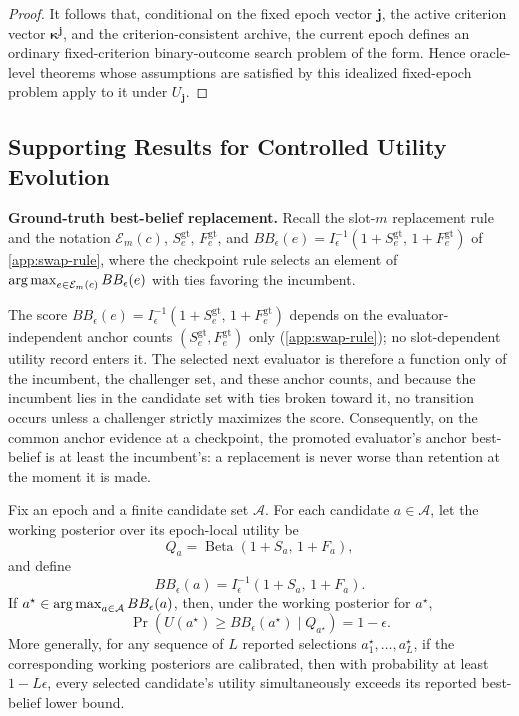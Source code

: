 \begin{proof}
It follows that, conditional on the fixed epoch vector \(\boldsymbol{j}\), the active criterion vector
\(\boldsymbol{\kappa}^{\boldsymbol{j}}\), and the criterion-consistent archive, the current epoch defines an
ordinary fixed-criterion binary-outcome search problem of the \hgm form. Hence \hgm oracle-level
theorems whose assumptions are satisfied by this idealized fixed-epoch problem apply to it
under \(U_{\boldsymbol{j}}\).
\end{proof}



\subsection{Supporting Results for Controlled Utility Evolution}
\label{app:controlled_utility_proofs}


\noindent\textbf{Ground-truth best-belief replacement.}
Recall the slot-\(m\) replacement rule and the notation \(\mathcal E_m(c)\), \(S^{\mathrm{gt}}_e\), \(F^{\mathrm{gt}}_e\), and \(BB_\epsilon(e)=I^{-1}_{\epsilon}(1+S^{\mathrm{gt}}_e,\,1+F^{\mathrm{gt}}_e)\) of \cref{app:swap-rule}, where the checkpoint rule selects an element of \(\operatorname*{arg\,max}_{e\in\mathcal E_m(c)}BB_\epsilon(e)\) with ties favoring the incumbent.

\begin{remark}
\label{prop:anchor-best-belief-replacement}
The score \(BB_\epsilon(e)=I^{-1}_\epsilon(1+S^{\mathrm{gt}}_e,\,1+F^{\mathrm{gt}}_e)\) depends on the evaluator-independent anchor counts \((S^{\mathrm{gt}}_e,F^{\mathrm{gt}}_e)\) only (\cref{app:swap-rule}); no slot-dependent utility record enters it. The selected next evaluator is therefore a function only of the incumbent, the challenger set, and these anchor counts, and because the incumbent lies in the candidate set with ties broken toward it, no transition occurs unless a challenger strictly maximizes the score. Consequently, on the common anchor evidence at a checkpoint, the promoted evaluator's anchor best-belief is at least the incumbent's: a replacement is never worse than retention at the moment it is made.
\end{remark}

\begin{proposition}
\label{prop:best-belief-lower-bound}
Fix an epoch and a finite candidate set \(\mathcal A\). For each candidate \(a\in\mathcal A\), let the \hgm working posterior over its epoch-local utility be
\[
Q_a=\operatorname{Beta}(1+S_a,\,1+F_a),
\]
and define
\[
BB_\epsilon(a)=I^{-1}_\epsilon(1+S_a,\,1+F_a).
\]
If \(a^\star\in\operatorname*{arg\,max}_{a\in\mathcal A}BB_\epsilon(a)\), then, under the working posterior for \(a^\star\),
\[
\Pr\!\left(U(a^\star)\ge BB_\epsilon(a^\star)\mid Q_{a^\star}\right)=1-\epsilon.
\]
More generally, for any sequence of \(L\) reported selections \(a^\star_1,\ldots,a^\star_L\), if the corresponding working posteriors are calibrated, then with probability at least \(1-L\epsilon\), every selected candidate's utility simultaneously exceeds its reported best-belief lower bound.
\end{proposition}

